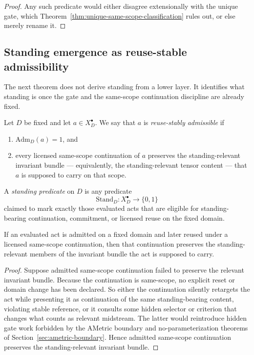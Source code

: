\begin{proof}
Any such predicate would either disagree extensionally with the unique gate, which Theorem~\ref{thm:unique-same-scope-classification} rules out, or else merely rename it.
\end{proof}

\subsection{Standing emergence as reuse-stable admissibility}

The next theorem does not derive standing from a lower layer. It identifies what standing is once the gate and the same-scope continuation discipline are already fixed.

\begin{definition}
Let $D$ be fixed and let $a\in X_D^{\bullet}$. We say that $a$ is \emph{reuse-stably admissible} if
\begin{enumerate}
  \item $\mathrm{Adm}_D(a)=1$, and
  \item every licensed same-scope continuation of $a$ preserves the standing-relevant invariant bundle --- equivalently, the standing-relevant tensor content --- that $a$ is supposed to carry on that scope.
\end{enumerate}
\end{definition}

\begin{definition}
A \emph{standing predicate} on $D$ is any predicate
\[
\mathrm{Stand}_D : X_D^{\bullet} \to \{0,1\}
\]
claimed to mark exactly those evaluated acts that are eligible for standing-bearing continuation, commitment, or licensed reuse on the fixed domain.
\end{definition}

\begin{proposition}
\label{prop:admitted-continuation-preserves-bundle}
If an evaluated act is admitted on a fixed domain and later reused under a licensed same-scope continuation, then that continuation preserves the standing-relevant members of the invariant bundle the act is supposed to carry.
\end{proposition}

\begin{proof}
Suppose admitted same-scope continuation failed to preserve the relevant invariant bundle. Because the continuation is same-scope, no explicit reset or domain change has been declared. So either the continuation silently retargets the act while presenting it as continuation of the same standing-bearing content, violating stable reference, or it consults some hidden selector or criterion that changes what counts as relevant midstream. The latter would reintroduce hidden gate work forbidden by the AMetric boundary and no-parameterization theorems of Section~\ref{sec:ametric-boundary}. Hence admitted same-scope continuation preserves the standing-relevant invariant bundle.\cite{MaleyNecessity}
\end{proof}

